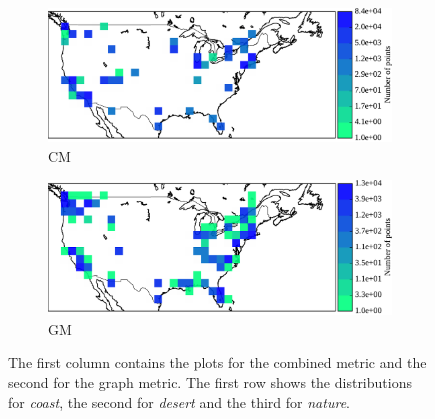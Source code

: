 \begin{figure}
\begin{subfigure}[b]{.45\textwidth}
	\end{subfigure}
	\,
	\begin{subfigure}[b]{.45\textwidth}
	\centering
	\includegraphics[width=\textwidth]{pix/freq_COM_usa_nature.pdf}
		\caption{CM}
	\end{subfigure}
	\hfill
	\begin{subfigure}[b]{.45\textwidth}
	\centering
	\includegraphics[width=\textwidth]{pix/freq_RW_usa_nature.pdf}
		\caption{GM}
	\end{subfigure}
	\caption[Distributions for \emph{coast}, \emph{desert}, \emph{nature} with dataset C.]{The first column contains the plots for the combined metric and the second for the graph metric. The first row shows the distributions for \emph{coast}, the second for \emph{desert} and the third for \emph{nature}.}
	\label{fig:C_comp}
\end{figure}